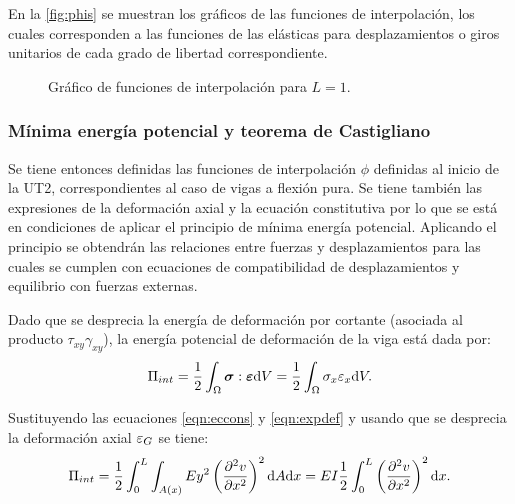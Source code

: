 En la \autoref{fig:phis} se muestran los gráficos de las funciones de interpolación, los cuales corresponden a las funciones de las elásticas para desplazamientos o giros unitarios de cada grado de libertad correspondiente. %
%

%
\begin{figure}[htb]
	\centering
	\caption{Gráfico de funciones de interpolación para $L=1$.}
	\label{fig:phis}
\end{figure}




\subsubsection{Mínima energía potencial y teorema de Castigliano}


Se tiene entonces definidas las funciones de interpolación $\phi$ definidas al inicio de la UT2, correspondientes al caso de vigas a flexión pura.
%
Se tiene también las expresiones de la deformación axial y la ecuación constitutiva por lo que se está en condiciones de aplicar el principio de mínima energía potencial. Aplicando el principio se obtendrán las relaciones entre fuerzas y desplazamientos para las cuales se cumplen con ecuaciones de compatibilidad de desplazamientos y equilibrio con fuerzas externas.

Dado que se desprecia la energía de deformación por cortante (asociada al producto $\tau_{xy} \gamma_{xy}$), la energía potencial de deformación de la viga está dada por:
%
\begin{equation}
\Pi_{int} = \frac{1}{2} \int_\Omega \boldsymbol{\sigma} : \boldsymbol{\varepsilon}  {\text{d}} V  = \frac{1}{2} \int_\Omega \sigma_x \varepsilon_x  {\text{d}} V. 
\end{equation}

Sustituyendo las ecuaciones \eqref{eqn:eccons} y \eqref{eqn:expdef} y usando que se desprecia la deformación axial $\varepsilon_G$ se tiene:
%
\begin{equation}\label{eqn:ut3piviga}
\Pi_{int} = \frac{1}{2} \int_0^L \int_{A(x)} E y^2 \left( \frac{\partial^2 v}{\partial x^2}\right)^2  {\text{d}} A {\text{d}} x 
=  E I  \frac{1}{2} \int_0^L \left( \frac{\partial^2 v}{\partial x^2}\right)^2 {\text{d}} x .
\end{equation}

